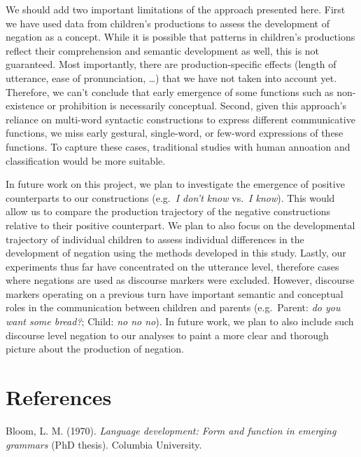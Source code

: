 \documentclass[10pt, letterpaper]{article}
\begin{document}
We should add two important limitations of the approach presented here.
First we have used data from children's productions to assess the
development of negation as a concept. While it is possible that patterns
in children's productions reflect their comprehension and semantic
development as well, this is not guaranteed. Most importantly, there are
production-specific effects (length of utterance, ease of pronunciation,
\ldots) that we have not taken into account yet. Therefore, we can't
conclude that early emergence of some functions such as non-existence or
prohibition is necessarily conceptual. Second, given this approach's
reliance on multi-word syntactic constructions to express different
communicative functions, we miss early gestural, single-word, or
few-word expressions of these functions. To capture these cases,
traditional studies with human annoation and classification would be
more suitable.

In future work on this project, we plan to investigate the emergence of
positive counterparts to our constructions (e.g.~\emph{I don't know}
vs.~\emph{I know}). This would allow us to compare the production
trajectory of the negative constructions relative to their positive
counterpart. We plan to also focus on the developmental trajectory of
individual children to assess individual differences in the development
of negation using the methods developed in this study. Lastly, our
experiments thus far have concentrated on the utterance level, therefore
cases where negations are used as discourse markers were excluded.
However, discourse markers operating on a previous turn have important
semantic and conceptual roles in the communication between children and
parents (e.g.~Parent: \emph{do you want some bread?}; Child: \emph{no no
no}). In future work, we plan to also include such discourse level
negation to our analyses to paint a more clear and thorough picture
about the production of negation.

\hypertarget{references}{%
\section{References}\label{references}}

\setlength{\parindent}{-0.1in} 
\setlength{\leftskip}{0.125in}

\noindent

\hypertarget{refs}{}
\leavevmode\hypertarget{ref-bloom1970language}{}%
Bloom, L. M. (1970). \emph{Language development: Form and function in
emerging grammars} (PhD thesis). Columbia University.
\end{document}
